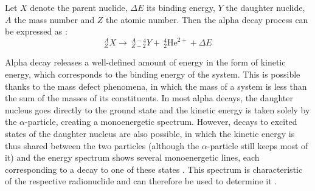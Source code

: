 Let $X$ denote the parent nuclide, $\Delta E$ its binding energy, $Y$ the daughter nuclide, $A$ the mass number and $Z$ the atomic number. Then the alpha decay process can be expressed as \cite{dewiki:240085809}:
\begin{equation*}
	^{A}_{Z}X \longrightarrow \ ^{A-4}_{Z-2}Y + \ ^4_2\text{He}^{2+} + \Delta E
\end{equation*}

Alpha decay releases a well-defined amount of energy in the form of kinetic energy, which corresponds to the binding energy of the system. This is possible thanks to the mass defect phenomena, in which the mass of a system is less than the sum of the masses of its constituents. 
In most alpha decays, the daughter nucleus goes directly to the ground state and the kinetic energy is taken solely by the $\alpha$-particle, creating a monoenergetic spectrum. However, decays to excited states of the daughter nucleus are also possible, in which the kinetic energy is thus shared between the two particles (although the $\alpha$-particle still keeps most of it) and the energy spectrum shows several monoenergetic lines, each corresponding to a decay to one of these states \cite{leo}. This spectrum is characteristic of the respective radionuclide and can therefore be used to determine it \cite{dewiki:240085809}.

